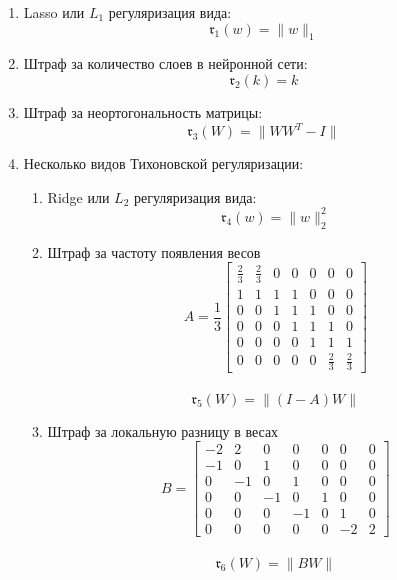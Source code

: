 \documentclass[12pt, twoside]{article}
\newcommand{\rk}{\mathfrak{r}}
\begin{document}
\begin{enumerate}[label*=\arabic*.]
    \item
    Lasso или $L_1$ регуляризация вида:
    \[\rk_1(w) = \|w\|_1\]
    \item
    Штраф за количество слоев в нейронной сети:
    \[\rk_2(k) = k\]
    \item
    Штраф за неортогональность матрицы:
    \[\rk_3(W) = \|WW^T - I\|\]
    \item 
    Несколько видов Тихоновской регуляризации:
    \begin{enumerate}[label*=\arabic*.]
        \item
        Ridge или $L_2$ регуляризация вида:
        \[\rk_4(w) = \|w\|_2^2\]
        \item
        Штраф за частоту появления весов
        \[
        A = \frac{1}{3} \begin{bmatrix}
            \frac{2}{3}& \frac{2}{3} & 0 & 0 &0 &0& 0\\
            1 & 1 & 1 & 1& 0 & 0 & 0 \\
            0& 0& 1 & 1& 1 & 0 & 0 \\
            0& 0& 0 & 1& 1 & 1 & 0 \\
            0& 0& 0 & 0& 1 & 1 & 1\\
            0& 0& 0 & 0 & 0& \frac{2}{3}& \frac{2}{3}
        \end{bmatrix}
        \]
        \\
        
        \[\rk_5(W) =  \|(I -A)W\|\]
        \item 
        Штраф за локальную разницу в весах
        \[
        B = \begin{bmatrix}
            -2& 2 & 0 & 0 & 0 &0 &0\\
            -1 & 0 & 1 & 0& 0 & 0 & 0 \\
            0& -1& 0 & 1& 0 & 0 & 0 \\
            0& 0& -1 & 0& 1 & 0 & 0 \\
            0& 0& 0 & -1& 0 & 1 & 0\\
            0& 0& 0 & 0 & 0& -2& 2
        \end{bmatrix}
        \]
        \\
        \[\rk_6(W) =  \|BW\|\]
    \end{enumerate}
\end{enumerate}
\end{document}
